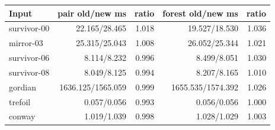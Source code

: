 \begin{center}\small
\begin{tabular}{@{}lrrrr@{}}
\toprule
Input & pair old/new ms & ratio & forest old/new ms & ratio \\
\midrule
survivor-00 & 22.165/28.465 & 1.018 & 19.527/18.530 & 1.036 \\
mirror-03 & 25.315/25.043 & 1.008 & 26.052/25.344 & 1.021 \\
survivor-06 & 8.114/8.232 & 0.996 & 8.499/8.051 & 1.030 \\
survivor-08 & 8.049/8.125 & 0.994 & 8.207/8.165 & 1.010 \\
gordian & 1636.125/1565.059 & 0.999 & 1655.535/1574.392 & 1.026 \\
trefoil & 0.057/0.056 & 0.993 & 0.056/0.056 & 1.000 \\
conway & 1.019/1.039 & 0.998 & 1.028/1.029 & 1.003 \\
\bottomrule
\end{tabular}
\end{center}
